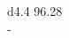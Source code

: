 \documentclass[border = 1mm]{standalone}
\begin{document}
    
\begin{tabular}{d{4.4}}
    96.28 \\
    - \\
    \hline
     \\
    \hline\\
\end{tabular}
\end{document}
